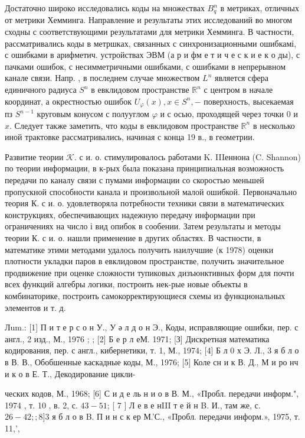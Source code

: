 \documentclass[10pt]{article}
\begin{document}
Достаточно широко исследовались коды на множествах $B_{q}^{n}$ в метриках, отличных от метрики Хемминга. Направление и результаты этих исследований во многом сходны с соответствующими результатами для метрики Хемминга. В частности, рассматривались коды в метршках, связанных с синхронизационными ошибкамі, с ошибками в арифметич. устройствах ЭВМ (а р и фм е т и ч е с к и е к о ды), с пачками ошибок, с несимметричными ошибками, с ошибками в непрерывном канале связи. Напр. , в последнем случае множеством $L^{n}$ является сфера единичного радиуса $S^{n}$ в евклидовом пространстве $\mathbb{R}^{n}$ с центром в начале координат, а окрестностью ошибок $U_{\varphi}(x), x \in S^{n},-$ поверхность, высекаемая пз $S^{n-1}$ круговым конусом с полууглом $\varphi$ и с осью, проходящей через точки 0 и $x$. Следует также заметить, что коды в евклидовом пространстве $\mathbb{R}^{n}$ в несколько иной трактовке рассматривались, начиная с конца 19 в., в геометрии.



Развитие теории $\mathcal{K}$. с и. о. стимулировалось работами K. IIIеннона (C. Shannon) по теории информации, в к-рых была показана принципиальная возможность передачи по каналу связи с пумами информации со скоростью меньшей пропускной способности канала и произвольной малой ошибкой. Первоначально теория К. с и. $о$. удовлетворяла потребности техники связи в математических конструкциях, обеспечивающих надежную передачу информации при ограничениях на число і вид опибок в сообении. Затем результаты и методы теории К. с и. о. нашли применение в других областях. В частности, в математике этими методами удалось получить наилучшие (к 1978) оценки плотности укладки паров в евклидовом пространстве, получить значительное продвижение при оценке сложности тупиковых дизъюнктивных форм для почти всех функций алгебры логики, построить нек-рые новые объекты в комбинаторике, построить самокорректирующиеся схемы из функциональных элементов и т. д.



Лum.: [1] П и т е р с о н У., У ә л д о н Э., Коды, исправляющие ошибки, пер. с англ., 2 изд., М., 1976 ; ; [2] Б е р л еМ. 1971; [З] Дискретная математика кодирования, пер. с англ., кибернетики, т. 1, М., 1974; [4] Б л 0 х Э. Л., 3 я б л о в В. В., Обобшенные каскадные коды, М., 1976; [5] Коле сн и к В. Д., М и ро нч и к о в Е. Т., Декодирование цикли-

ческих кодов, М., 1968; [6] С и д е ль н и о в В. М., «Пробл. передачи информ.", 1974 , т. 10 , в. 2, с. $43-51$; [ 7 ] Л е в е нIII т е й н B. И., там же, с. $26-42 ; ; 8] 3$ я б л о в B. П и н с к ер М.'С., «Пробл. передачи информ.», 1975, т. 11,',
\end{document}
